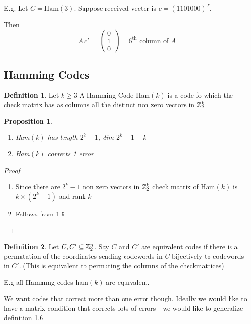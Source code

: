 \documentclass[]{article}
\newtheorem{prop}[thm]{Proposition}
\theoremstyle{definition}
\newtheorem*{defn}{Definition}
\theoremstyle{remark}
\numberwithin{equation}{section}
\begin{document}
		E.g. Let $C = \text{Ham}(3)$.
		Suppose received vector is $c= (1101000)^T$.

		Then \[
			A\ c' = \left(\begin{smallmatrix}0\\1\\0\end{smallmatrix}\right) = \text{$6^\text{th}$ column of $A$}
		\]
	\subsection{Hamming Codes}

		\begin{defn}
		Let $k\geq3$ A Hamming Code Ham$(k)$ is a code fo which the check matrix has as columns all the distinct non zero vectors in $\mathbb{Z}_2^k$
		\end{defn}


		\begin{prop}
		\begin{enumerate}
			\item Ham$(k)$ has length $2^k-1$, dim $2^k-1 - k$
			\item Ham$(k)$ corrects 1 error
		\end{enumerate}
		\end{prop}
		\begin{proof}
			\par
			\begin{enumerate}
			\item\par
				Since there are $2^k-1$ non zero vectors in $\mathbb{Z}_2^k$ check matrix of Ham$(k)$ is $k\times (2^k-1)$ and rank $k$
			\item\par
				Follows from 1.6 
			\end{enumerate}
		\end{proof}

		\begin{defn}
		Let $C, C' \subseteq \mathbb{Z}_2^n$. Say $C$ and $C'$ are equivalent codes if there is a permutation of the coordinates sending codewords in $C$ bijectively to codewords in $C'$. (This is equivalent to permuting the columns of the checkmatrices)
		\end{defn}

		E.g all Hamming codes ham$(k)$ are equivalent.

		We want codes that correct more than one error though. Ideally we would like to have a matrix condition that corrects lots of errors - we would like to generalize definition 1.6
\end{document}
